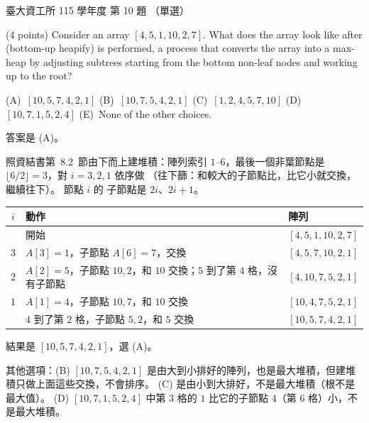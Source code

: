 \begin{pastexam}[label={px:ntu-115-dsa-10}]{臺大資工所 115 學年度 第 10 題}
（單選）

(4 points) Consider an array $[4,5,1,10,2,7]$. What does the array look like after  (bottom-up heapify) is performed, a process that converts the array into a max-heap by adjusting subtrees starting from the bottom non-leaf nodes and working up to the root?


(A)~$[10,5,7,4,2,1]$ \qquad (B)~$[10,7,5,4,2,1]$ \qquad (C)~$[1,2,4,5,7,10]$ \qquad (D)~$[10,7,1,5,2,4]$ \qquad (E)~None of the other choices.
\end{pastexam}

\begin{pastsoln}
答案是 (A)。

照資結書第~8.2~節由下而上建堆積：陣列索引 $1$--$6$，最後一個非葉節點是 $\lfloor 6/2 \rfloor = 3$，對
$i = 3, 2, 1$ 依序做 （往下篩：和較大的子節點比，比它小就交換，繼續往下）。 節點 $i$ 的
子節點是 $2i$、$2i + 1$。
\begin{center}
\begin{tabular}{cll}
\toprule
$i$ & 動作 & 陣列 \\
\midrule
 & 開始 & $[4, 5, 1, 10, 2, 7]$ \\
$3$ & $A[3] = 1$，子節點 $A[6] = 7$，交換 & $[4, 5, 7, 10, 2, 1]$ \\
$2$ & $A[2] = 5$，子節點 $10, 2$，和 $10$ 交換；$5$ 到了第 $4$ 格，沒有子節點 & $[4, 10, 7, 5, 2, 1]$ \\
$1$ & $A[1] = 4$，子節點 $10, 7$，和 $10$ 交換 & $[10, 4, 7, 5, 2, 1]$ \\
 & $4$ 到了第 $2$ 格，子節點 $5, 2$，和 $5$ 交換 & $[10, 5, 7, 4, 2, 1]$ \\
\bottomrule
\end{tabular}
\end{center}
結果是 $[10, 5, 7, 4, 2, 1]$，選 (A)。

其他選項：(B) $[10, 7, 5, 4, 2, 1]$ 是由大到小排好的陣列，也是最大堆積，但建堆積只做上面這些交換，不會排序。
(C) 是由小到大排好，不是最大堆積（根不是最大值）。 (D) $[10, 7, 1, 5, 2, 4]$ 中第 $3$ 格的 $1$ 比它的子節點
$4$（第 $6$ 格）小，不是最大堆積。
\end{pastsoln}
